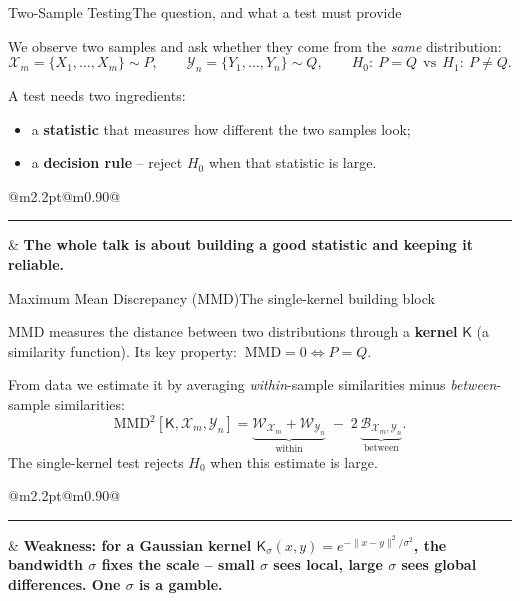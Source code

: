 \documentclass[aspectratio=169,10pt]{beamer}
\makeatletter
\newcommand{\keyline}[1]{%
  \vspace{0.04cm}
  \noindent\begin{tabular}{@{}m{2.2pt}@{\hspace{0.55em}}m{0.90\linewidth}@{}}
    {\color{accentgreen}\rule{2.2pt}{1.35em}} & \textbf{#1}
  \end{tabular}
  \vspace{0.09cm}
}
\newcommand{\sfK}{\mathsf{K}}                      %
\makeatother
\begin{document}
\begin{frame}{Two-Sample Testing}{The question, and what a test must provide}

\vspace{0.04cm}
We observe two samples and ask whether they come from the \emph{same} distribution:
\[
  \mathcal X_m=\{X_1,\dots,X_m\}\sim P,\qquad
  \mathcal Y_n=\{Y_1,\dots,Y_n\}\sim Q,
  \qquad
  H_0:\ P=Q \ \ \text{vs}\ \ H_1:\ P\ne Q.
\]

\vspace{0.30cm}
A test needs two ingredients:
\begin{itemize}
  \item a \textbf{statistic} that measures how different the two samples look;
  \item a \textbf{decision rule} -- reject $H_0$ when that statistic is large.
\end{itemize}

\vspace{0.30cm}
\keyline{The whole talk is about building a good statistic and keeping it reliable.}

\end{frame}

\begin{frame}{Maximum Mean Discrepancy (MMD)}{The single-kernel building block}

\vspace{0.04cm}
MMD measures the distance between two distributions through a \textbf{kernel} $\sfK$
(a similarity function). Its key property: $\ \mathrm{MMD}=0 \iff P=Q$.

\vspace{0.25cm}
From data we estimate it by averaging \emph{within}-sample similarities minus
\emph{between}-sample similarities:
\[
  \mathrm{MMD}^2[\sfK,\mathcal X_m,\mathcal Y_n]
  = \underbrace{\mathcal W_{\mathcal X_m} + \mathcal W_{\mathcal Y_n}}_{\text{within}}
    \;-\; 2\,\underbrace{\mathcal B_{\mathcal X_m,\mathcal Y_n}}_{\text{between}} .
\]
The single-kernel test rejects $H_0$ when this estimate is large.

\vspace{0.25cm}
\keyline{Weakness: for a Gaussian kernel $\sfK_\sigma(x,y)=e^{-\|x-y\|^2/\sigma^2}$, the bandwidth $\sigma$ fixes the scale -- small $\sigma$ sees local, large $\sigma$ sees global differences. One $\sigma$ is a gamble.}

\end{frame}
\end{document}
